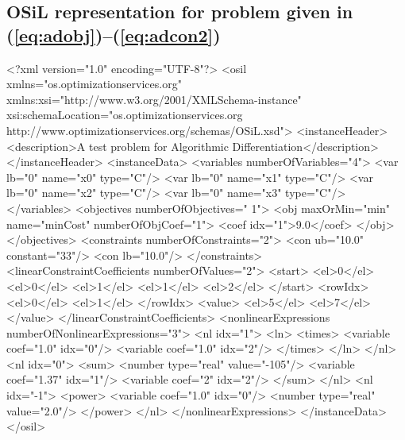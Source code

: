 \documentclass[11pt]{article}
\newcommand{\bibpath}{/Users/kmartin/Documents/files/misc}
\renewcommand{\_}{{\char"5F}}
\renewcommand{\{}{{\char"7B}}
\renewcommand{\}}{{\char"7D}}
\renewcommand{\^}{{\char"0D}}
\renewcommand{\'}{{\char"0D}}
\begin{document}
\subsection{OSiL representation for problem given in (\ref{eq:adobj})--(\ref{eq:adcon2})}\label{section:adexample}

\begin{verbatimtab}
<?xml version="1.0" encoding="UTF-8"?>
<osil xmlns="os.optimizationservices.org" xmlns:xsi="http://www.w3.org/2001/XMLSchema-instance"
	xsi:schemaLocation="os.optimizationservices.org http://www.optimizationservices.org/schemas/OSiL.xsd">
	<instanceHeader>
		<description>A test problem for Algorithmic Differentiation</description>
	</instanceHeader>
	<instanceData>
		<variables numberOfVariables="4">
			<var lb="0" name="x0" type="C"/>
			<var lb="0" name="x1" type="C"/>
			<var lb="0" name="x2" type="C"/>
			<var lb="0" name="x3" type="C"/>
		</variables>
		<objectives numberOfObjectives=" 1">
			<obj maxOrMin="min" name="minCost" numberOfObjCoef="1">
				<coef idx="1">9.0</coef>
			</obj>
		</objectives>
		<constraints numberOfConstraints="2">
			<con ub="10.0" constant="33"/>
			<con lb="10.0"/>
		</constraints>
		<linearConstraintCoefficients numberOfValues="2">
			<start>
				<el>0</el>
				<el>0</el>
				<el>1</el>
				<el>1</el>
				<el>2</el>
			</start>
			<rowIdx>
				<el>0</el>
				<el>1</el>
			</rowIdx>
			<value>
				<el>5</el>
				<el>7</el>
			</value>
		</linearConstraintCoefficients>
		<nonlinearExpressions numberOfNonlinearExpressions="3">
			<nl idx="1">
				<ln>
					<times>
						<variable coef="1.0" idx="0"/>
						<variable coef="1.0" idx="2"/>
					</times>	
				</ln>
			</nl>
			<nl idx="0">
				<sum>
					<number type="real" value="-105"/>
					<variable coef="1.37" idx="1"/>
					<variable coef="2" idx="2"/>
				</sum>	
			</nl>
			<nl idx="-1">
				<power>
					<variable coef="1.0" idx="0"/>
					<number type="real" value="2.0"/>
				</power>
			</nl>
		</nonlinearExpressions>
	</instanceData>
</osil>
\end{verbatimtab}



\end{document}
